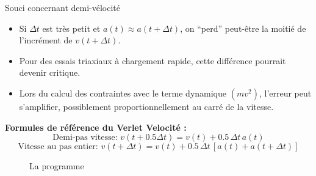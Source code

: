 \documentclass[10pt]{beamer}
\begin{document}
\begin{frame}{Souci concernant demi-vélocité}
    \begin{itemize}
        \item Si $\Delta t$ est très petit et $a(t) \approx a(t+\Delta t)$, on “perd” peut-être la moitié de l'incrément de $v(t+\Delta t)$.
        \item Pour des essais triaxiaux à chargement rapide, cette différence pourrait devenir critique.
        \item Lors du calcul des contraintes avec le terme dynamique $(mv^2)$, l'erreur peut s'amplifier, possiblement proportionnellement au carré de la vitesse.
    \end{itemize}

    \textbf{Formules de référence du Verlet Velocité :}
    \[
        \text{Demi-pas vitesse: } v(t + 0.5\Delta t) = v(t) + 0.5\,\Delta t\, a(t)
    \]
    \[
        \text{Vitesse au pas entier: } v(t + \Delta t) = v(t) + 0.5\,\Delta t \,[a(t) + a(t+\Delta t)]
    \]

    \begin{figure}[h]
        \centering
        \caption{La programme}
    \end{figure}
\end{frame}
\end{document}
